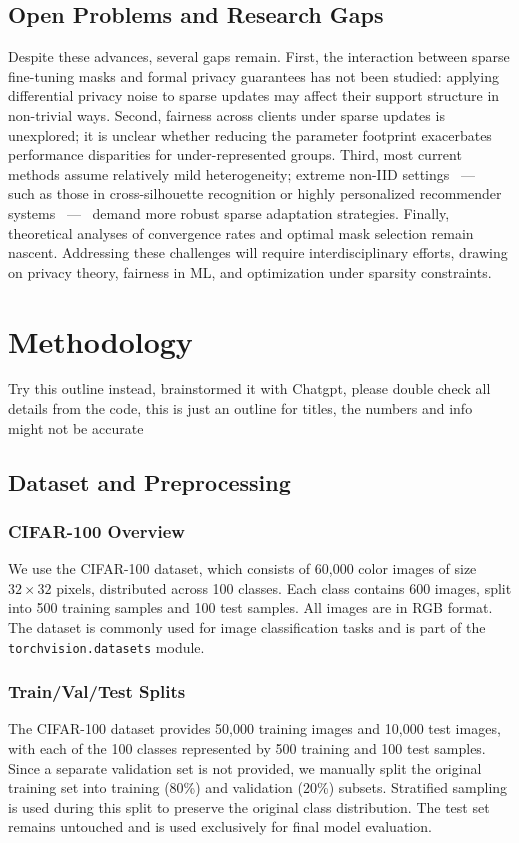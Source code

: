 \documentclass[10pt,twocolumn,letterpaper]{article}
\begin{document}
\subsection{Open Problems and Research Gaps}
Despite these advances, several gaps remain. First, the interaction between sparse fine-tuning masks and formal privacy guarantees has not been studied: applying differential privacy noise to sparse updates may affect their support structure in non-trivial ways. Second, fairness across clients under sparse updates is unexplored; it is unclear whether reducing the parameter footprint exacerbates performance disparities for under-represented groups. Third, most current methods assume relatively mild heterogeneity; extreme non-IID settings ~—~ such as those in cross-silhouette recognition or highly personalized recommender systems ~—~ demand more robust sparse adaptation strategies. Finally, theoretical analyses of convergence rates and optimal mask selection remain nascent. Addressing these challenges will require interdisciplinary efforts, drawing on privacy theory, fairness in ML, and optimization under sparsity constraints.

\section{Methodology}
\label{sec:method}

Try this outline instead, brainstormed it with Chatgpt, please double check all details from the code, this is just an outline for titles, the numbers and info might not be accurate
\subsection{Dataset and Preprocessing}

\subsubsection{CIFAR-100 Overview}
We use the CIFAR-100 dataset, which consists of 60{,}000 color images of size $32{\times}32$ pixels, distributed across 100 classes. Each class contains 600 images, split into 500 training samples and 100 test samples. All images are in RGB format. The dataset is commonly used for image classification tasks and is part of the \texttt{torchvision.datasets} module.

\subsubsection{Train/Val/Test Splits}
The CIFAR-100 dataset provides 50{,}000 training images and 10{,}000 test images, with each of the 100 classes represented by 500 training and 100 test samples. Since a separate validation set is not provided, we manually split the original training set into training (80\%) and validation (20\%) subsets. Stratified sampling is used during this split to preserve the original class distribution. The test set remains untouched and is used exclusively for final model evaluation.
\end{document}
